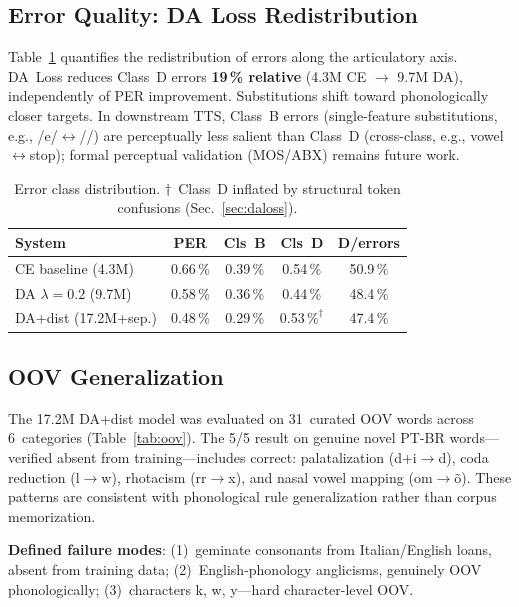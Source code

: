 \documentclass[conference]{IEEEtran}
\begin{document}
\subsection{Error Quality: DA Loss Redistribution}

Table~\ref{tab:classdist} quantifies the redistribution of errors
along the articulatory axis.
DA~Loss reduces Class~D errors \textbf{19\,\% relative}
(4.3M CE $\to$ 9.7M DA), independently of PER improvement.
Substitutions shift toward phonologically closer targets.
In downstream TTS, Class~B errors (single-feature substitutions,
e.g., /e/$\leftrightarrow$//) are perceptually less
salient than Class~D (cross-class, e.g., vowel$\leftrightarrow$stop);
formal perceptual validation (MOS/ABX) remains future work.

\begin{table}[t]
  \caption{Error class distribution. $\dagger$~Class~D inflated by
           structural token confusions (Sec.~\ref{sec:daloss}).}
  \label{tab:classdist}
  \centering\small
  \begin{tabular}{lcccc}
    \toprule
    System & PER & Cls~B & Cls~D & D/errors \\
    \midrule
    CE baseline (4.3M)         & 0.66\,\% & 0.39\,\% & 0.54\,\% & 50.9\,\% \\
    DA $\lambda\!=\!0.2$ (9.7M) & 0.58\,\% & 0.36\,\% & 0.44\,\% & 48.4\,\% \\
    DA+dist (17.2M+sep.)       & 0.48\,\% & 0.29\,\% & 0.53\,$\%^\dagger$ & 47.4\,\% \\
    \bottomrule
  \end{tabular}
\end{table}

\subsection{OOV Generalization}

The 17.2M DA+dist model was evaluated on 31~curated OOV words across
6~categories (Table~\ref{tab:oov}).
The 5/5 result on genuine novel PT-BR words---verified absent from
training---includes correct: palatalization (d+i$\to$d),
coda reduction (l$\to$w), rhotacism (rr$\to$x), and nasal vowel
mapping (om$\to$\~{o}).
These patterns are consistent with phonological rule generalization
rather than corpus memorization.

\textbf{Defined failure modes}: (1)~geminate consonants from
Italian/English loans, absent from training data;
(2)~English-phonology anglicisms, genuinely OOV phonologically;
(3)~characters k, w, y---hard character-level OOV.
\end{document}
